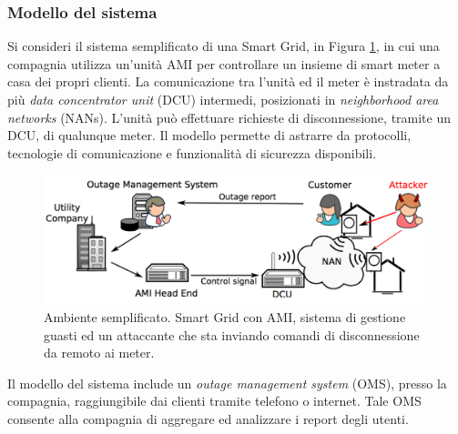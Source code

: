 \subsubsection{Modello del sistema}
Si consideri il sistema semplificato di una Smart Grid, in Figura \ref{simplesg_img}, in cui una compagnia utilizza un'unità AMI per controllare un insieme di smart meter a casa dei propri clienti. La comunicazione tra l'unità ed il meter è instradata da più \emph{data concentrator unit} (DCU) intermedi, posizionati in \emph{neighborhood area networks} (NANs). L'unità può effettuare richieste di disconnessione, tramite un DCU, di qualunque meter. Il modello permette di astrarre da protocolli, tecnologie di comunicazione e funzionalità di sicurezza disponibili.\\
\begin{figure}[h]
	\centering
	\includegraphics[scale=.3]{imgs/attack/simpleSG.png}
	\caption{Ambiente semplificato. Smart Grid con AMI, sistema di gestione guasti ed un attaccante che sta inviando comandi di disconnessione da remoto ai meter.}
	\label{simplesg_img}
\end{figure}
Il modello del sistema include un \emph{outage management system} (OMS), presso la compagnia, raggiungibile dai clienti tramite telefono o internet. Tale OMS consente alla compagnia di aggregare ed analizzare i report degli utenti.
